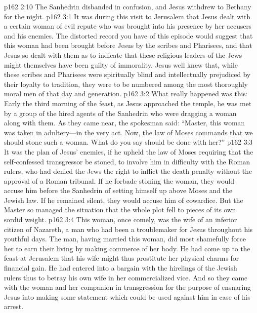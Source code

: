 \vs p162 2:10 The Sanhedrin disbanded in confusion, and Jesus withdrew to Bethany for the night.
\vs p162 3:1 It was during this visit to Jerusalem that Jesus dealt with a certain woman of evil repute who was brought into his presence by her accusers and his enemies. The distorted record you have of this episode would suggest that this woman had been brought before Jesus by the scribes and Pharisees, and that Jesus so dealt with them as to indicate that these religious leaders of the Jews might themselves have been guilty of immorality. Jesus well knew that, while these scribes and Pharisees were spiritually blind and intellectually prejudiced by their loyalty to tradition, they were to be numbered among the most thoroughly moral men of that day and generation.
\vs p162 3:2 What really happened was this: Early the third morning of the feast, as Jesus approached the temple, he was met by a group of the hired agents of the Sanhedrin who were dragging a woman along with them. As they came near, the spokesman said: “Master, this woman was taken in adultery---in the very act. Now, the law of Moses commands that we should stone such a woman. What do you say should be done with her?”
\vs p162 3:3 It was the plan of Jesus’ enemies, if he upheld the law of Moses requiring that the self\hyp{}confessed transgressor be stoned, to involve him in difficulty with the Roman rulers, who had denied the Jews the right to inflict the death penalty without the approval of a Roman tribunal. If he forbade stoning the woman, they would accuse him before the Sanhedrin of setting himself up above Moses and the Jewish law. If he remained silent, they would accuse him of cowardice. But the Master so managed the situation that the whole plot fell to pieces of its own sordid weight.\plusone
\vs p162 3:4 This woman, once comely, was the wife of an inferior citizen of Nazareth, a man who had been a troublemaker for Jesus throughout his youthful days. The man, having married this woman, did most shamefully force her to earn their living by making commerce of her body. He had come up to the feast at Jerusalem that his wife might thus prostitute her physical charms for financial gain. He had entered into a bargain with the hirelings of the Jewish rulers thus to betray his own wife in her commercialized vice. And so they came with the woman and her companion in transgression for the purpose of ensnaring Jesus into making some statement which could be used against him in case of his arrest.
